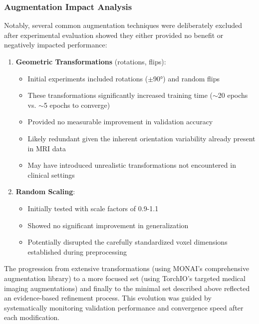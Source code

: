 \documentclass[12pt, a4paper]{article}
\begin{document}

\subsubsection{Augmentation Impact Analysis}

Notably, several common augmentation techniques were deliberately excluded after experimental evaluation showed they either provided no benefit or negatively impacted performance:

\begin{enumerate}
    \item \textbf{Geometric Transformations} (rotations, flips):
    \begin{itemize}
        \item Initial experiments included rotations ($\pm$90°) and random flips
        \item These transformations significantly increased training time ($\sim$20 epochs vs. $\sim$5 epochs to converge)
        \item Provided no measurable improvement in validation accuracy
        \item Likely redundant given the inherent orientation variability already present in MRI data
        \item May have introduced unrealistic transformations not encountered in clinical settings
    \end{itemize}

    \item \textbf{Random Scaling}:
    \begin{itemize}
        \item Initially tested with scale factors of 0.9-1.1
        \item Showed no significant improvement in generalization
        \item Potentially disrupted the carefully standardized voxel dimensions established during preprocessing
    \end{itemize}
\end{enumerate}

The progression from extensive transformations (using MONAI's comprehensive augmentation library) to a more focused set (using TorchIO's targeted medical imaging augmentations) and finally to the minimal set described above reflected an evidence-based refinement process. This evolution was guided by systematically monitoring validation performance and convergence speed after each modification.
\end{document}
